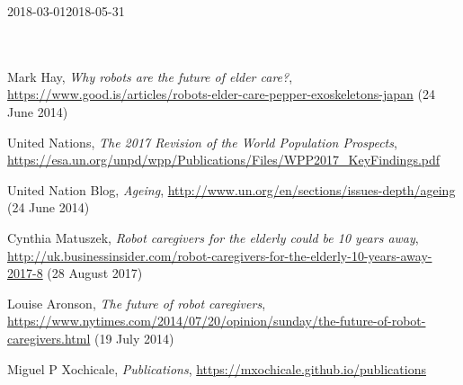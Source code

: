 \documentclass[12pt]{article}
\begin{document}
\vspace{10mm}

\begin{ganttchart}[
	hgrid,
	vgrid,
	x unit=1mm,
	time slot format=isodate-yearmonth
	]{2018-03-01}{2018-05-31}
 \\
 \\
 \\
\end{ganttchart}

\newpage







\newpage

\begin{thebibliography}{10}

Mark Hay,
{\it Why robots are the future of elder care?},
{\url{https://www.good.is/articles/robots-elder-care-pepper-exoskeletons-japan}} (24 June 2014)


United Nations,
{\it The 2017 Revision of the World Population Prospects},
{\url{https://esa.un.org/unpd/wpp/Publications/Files/WPP2017_KeyFindings.pdf}}


United Nation Blog,
{\it Ageing},
{\url{http://www.un.org/en/sections/issues-depth/ageing}} (24 June 2014)


Cynthia Matuszek,
{\it Robot caregivers for the elderly could be 10 years away},
{\url{http://uk.businessinsider.com/robot-caregivers-for-the-elderly-10-years-away-2017-8}} (28 August 2017)


Louise Aronson,
{\it The future of robot caregivers},
{\url{https://www.nytimes.com/2014/07/20/opinion/sunday/the-future-of-robot-caregivers.html}} (19 July 2014)



Miguel P Xochicale,
{\it Publications},
{\url{https://mxochicale.github.io/publications}}


\end{thebibliography}
\end{document}
